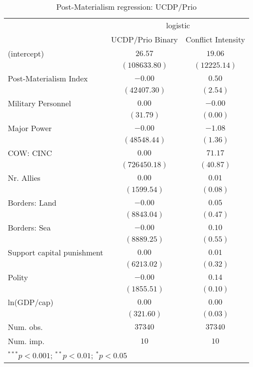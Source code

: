 
\begin{table}
\begin{center}
\begin{tabular}{l c c}
\toprule
 & \multicolumn{2}{c}{logistic} \\
\cmidrule(lr){2-3}
 & UCDP/Prio Binary & Conflict Intensity \\
\midrule
(intercept)                & $26.57$       & $19.06$      \\
                           & $(108633.80)$ & $(12225.14)$ \\
Post-Materialism Index     & $-0.00$       & $0.50$       \\
                           & $(42407.30)$  & $(2.54)$     \\
Military Personnel         & $0.00$        & $-0.00$      \\
                           & $(31.79)$     & $(0.00)$     \\
Major Power                & $-0.00$       & $-1.08$      \\
                           & $(48548.44)$  & $(1.36)$     \\
COW: CINC                  & $0.00$        & $71.17$      \\
                           & $(726450.18)$ & $(40.87)$    \\
Nr. Allies                 & $0.00$        & $0.01$       \\
                           & $(1599.54)$   & $(0.08)$     \\
Borders: Land              & $-0.00$       & $0.05$       \\
                           & $(8843.04)$   & $(0.47)$     \\
Borders: Sea               & $-0.00$       & $0.10$       \\
                           & $(8889.25)$   & $(0.55)$     \\
Support capital punishment & $0.00$        & $0.01$       \\
                           & $(6213.02)$   & $(0.32)$     \\
Polity                     & $-0.00$       & $0.14$       \\
                           & $(1855.51)$   & $(0.10)$     \\
ln(GDP/cap)                & $0.00$        & $0.00$       \\
                           & $(321.60)$    & $(0.03)$     \\
\midrule
Num. obs.                  & $37340$       & $37340$      \\
Num. imp.                  & $10$          & $10$         \\
\bottomrule
\multicolumn{3}{l}{\scriptsize{$^{***}p<0.001$; $^{**}p<0.01$; $^{*}p<0.05$}}
\end{tabular}
\caption{Post-Materialism regression: UCDP/Prio}
\label{UCDPIng}
\end{center}
\end{table}
